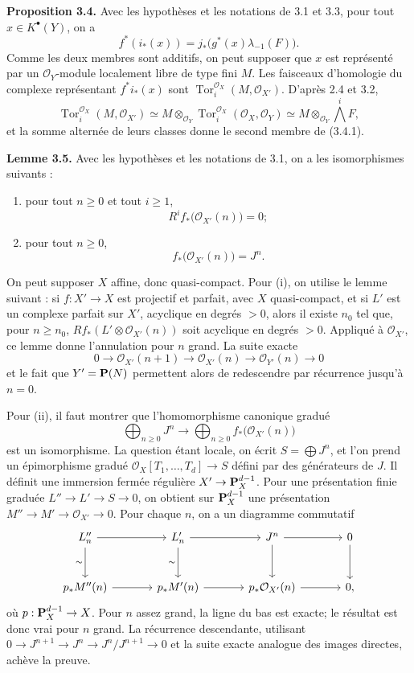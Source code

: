 \documentclass[11pt]{article}
\newcommand{\Tor}{\operatorname{Tor}}
\providecommand{\Tor}{\operatorname{Tor}}
\providecommand{\cO}{\mathcal O}
\begin{document}
\textbf{Proposition 3.4.} Avec les hypothèses et les notations de 3.1 et 3.3, pour tout \(x\in K^\bullet(Y)\), on a
\begin{equation}\tag{3.4.1}
f^*(i_*(x))=j_*\bigl(g^*(x)\lambda_{-1}(F)\bigr).
\end{equation}
Comme les deux membres sont additifs, on peut supposer que \(x\) est représenté par un \(\cO_Y\)-module localement libre de type fini \(M\). Les faisceaux d'homologie du complexe représentant \(f^*i_*(x)\) sont \(\Tor_i^{\cO_X}(M,\cO_{X'})\). D'après 2.4 et 3.2,
\[
\Tor_i^{\cO_X}(M,\cO_{X'})
\simeq M\otimes_{\cO_Y}\Tor_i^{\cO_X}(\cO_X,\cO_Y)
\simeq M\otimes_{\cO_Y}\bigwedge^iF,
\]
et la somme alternée de leurs classes donne le second membre de (3.4.1).

\textbf{Lemme 3.5.} Avec les hypothèses et les notations de 3.1, on a les isomorphismes suivants :
\begin{enumerate}[label=\roman*)]
\item pour tout \(n\ge0\) et tout \(i\ge1\),
\[
R^if_*\bigl(\cO_{X'}(n)\bigr)=0;
\]
\item pour tout \(n\ge0\),
\[
f_*\bigl(\cO_{X'}(n)\bigr)=J^n.
\]
\end{enumerate}
On peut supposer \(X\) affine, donc quasi-compact. Pour (i), on utilise le lemme suivant : si \(f:X'\to X\) est projectif et parfait, avec \(X\) quasi-compact, et si \(L'\) est un complexe parfait sur \(X'\), acyclique en degrés \(>0\), alors il existe \(n_0\) tel que, pour \(n\ge n_0\), \(Rf_*(L'\otimes\cO_{X'}(n))\) soit acyclique en degrés \(>0\). Appliqué à \(\cO_{X'}\), ce lemme donne l'annulation pour \(n\) grand. La suite exacte
\[
0\to \cO_{X'}(n+1)\to\cO_{X'}(n)\to\cO_{Y'}(n)\to0
\]
et le fait que \(Y'=\mathbf P(N)\) permettent alors de redescendre par récurrence jusqu'à \(n=0\).

Pour (ii), il faut montrer que l'homomorphisme canonique gradué
\[
\bigoplus_{n\ge0}J^n\longrightarrow\bigoplus_{n\ge0}f_*\bigl(\cO_{X'}(n)\bigr)
\]
est un isomorphisme. La question étant locale, on écrit \(S=\bigoplus J^n\), et l'on prend un épimorphisme gradué \(\cO_X[T_1,\ldots,T_d]\to S\) défini par des générateurs de \(J\). Il définit une immersion fermée régulière \(X'\to\mathbf P_X^{d-1}\). Pour une présentation finie graduée \(L''\to L'\to S\to0\), on obtient sur \(\mathbf P_X^{d-1}\) une présentation \(M''\to M'\to\cO_{X'}\to0\). Pour chaque \(n\), on a un diagramme commutatif
\[
\begin{tikzcd}[column sep=large,row sep=large]
L''_n \arrow[r] \arrow[d,"\sim"'] & L'_n \arrow[r] \arrow[d,"\sim"'] & J^n \arrow[r] \arrow[d] & 0 \arrow[d]\\
p_*M''(n) \arrow[r] & p_*M'(n) \arrow[r] & p_*\cO_{X'}(n) \arrow[r] & 0,
\end{tikzcd}
\]
où \(p:\mathbf P_X^{d-1}\to X\). Pour \(n\) assez grand, la ligne du bas est exacte; le résultat est donc vrai pour \(n\) grand. La récurrence descendante, utilisant \(0\to J^{n+1}\to J^n\to J^n/J^{n+1}\to0\) et la suite exacte analogue des images directes, achève la preuve.
\end{document}
